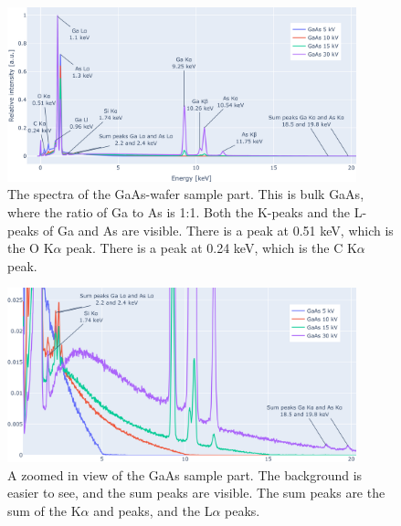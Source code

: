 \begin{figure}[p] %
    \centering
    \includegraphics[width=0.90\textwidth]{figures/each_spectra_not_on_github/GaAs_everything.png}
    \caption{
        The spectra of the GaAs-wafer sample part.
        This is bulk GaAs, where the ratio of Ga to As is 1:1.
        Both the K-peaks and the L-peaks of Ga and As are visible.
        There is a peak at 0.51 keV, which is the O K$\alpha$ peak.
        There is a peak at 0.24 keV, which is the C K$\alpha$ peak.
    }
    \label{fig:results:Spectra_GaAs}
\end{figure}


\begin{figure}[p]
    \centering
    \includegraphics[width=0.90\textwidth]{figures/each_spectra_not_on_github/GaAs_bg_and_sum_peaks.png}
    \caption{
        A zoomed in view of the GaAs sample part.
        The background is easier to see, and the sum peaks are visible.
        The sum peaks are the sum of the K$\alpha$ and peaks, and the L$\alpha$ peaks.
    }
    \label{fig:results:Spectra_GaAs_bg_and_sum_peaks}
\end{figure}


